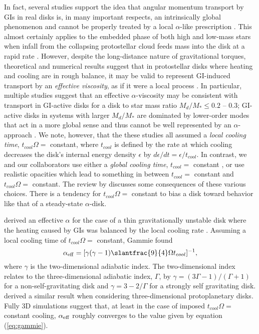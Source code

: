\documentclass[manuscript]{aastex}
\begin{document}
In fact, several studies support the idea that angular momentum transport by GIs in real disks is, in many important respects, an intrinsically global phenomenon and cannot be properly treated by a local $\alpha$-like prescription \citep{laughlin1996, balbus1999, lodato2005, mejia2005, boley2006, cai2008}.  This almost certainly applies to the embedded phase of both high and low-mass stars when infall from the collapsing protostellar cloud feeds mass into the disk at a rapid
rate \citep[e.g.,][]{yorke1993, laughlin1994, yorke1999,vorobyov2005,vorobyov2006,kratter2010}.  
However, despite the long-distance nature of gravitational torques, theoretical and numerical results suggest that in protostellar disks where heating and cooling are in rough balance, 
 it may be valid to represent GI-induced transport by an {\it effective viscosity}, as if it were a local process \citep{gammie2001, lodato2004, rice2005, cossins2009, vorobyov2010}.  In particular, multiple studies suggest that
an effective $\alpha$-viscosity may be consistent
with transport in GI-active disks for a disk to star mass ratio $M_d/M_* \le 0.2$ -- 0.3; GI-active disks
in systems with larger $M_d/M_*$ are dominated by lower-order modes that act in a more global sense and thus cannot be well represented by an $\alpha$-approach
\citep{lodato2004, cossins2009, vorobyov2010}. 
We note, however, that the these studies all assumed
a {\it local cooling time}, $t_{cool}\Omega =$ constant, 
where $t_{cool}$ is defined by the rate at which cooling decreases the disk's internal energy density
$\epsilon$ by $d\epsilon/dt = \epsilon / t_{cool}$.  In contrast, we and our collaborators use either a {\it global cooling time},
$t_{cool} = $ constant \citep[e.g.,][this paper]{pickett2003, mejia2005}, or use realistic opacities \citep[e.g.,][]{mejiaphd2004, cai2006, cai2008, boley2006, boley2007b,  boley2009} which lead to something in between $t_{cool} = $ constant  and
$t_{cool}\Omega =$ constant. The review by \citet{durisen2007} discusses some consequences of these various
choices. There is a tendency for $t_{cool}\Omega =$ constant to bias a disk toward behavior like that of a
steady-state $\alpha$-disk.

\citet{gammie2001} derived an effective $\alpha$ for the case of a thin gravitationally unstable disk where the heating
caused by GIs was balanced by the local cooling rate \citep[see also][]{pringle1981}.  
Assuming a local cooling time of $t_{cool}\Omega =$ constant,  Gammie found
\begin{equation}
\alpha_{\rm{eff}} = [\gamma(\gamma - 1) \slantfrac{9}{4}\Omega t_{cool}]^{-1},
\label{eq:gammie}
\end{equation}
where $\gamma$ is the two-dimensional adiabatic index. 
The two-dimensional index relates
to the three-dimensional adiabatic index, $\Gamma$, by 
$\gamma = (3\Gamma - 1) / (\Gamma + 1)$
for a non-self-gravitating
disk and
$\gamma = 3 - 2/\Gamma $
for a strongly self gravitating disk.   \cite{lodato2004} derived a similar result when considering three-dimensional protoplanetary disks.
Fully 3D simulations \citep[e.g.,][]{lodato2004, cossins2009} suggest that, at least in the case of imposed 
$t_{cool}\Omega = $ constant cooling, $\alpha_{\rm{\rm{eff}}}$ roughly converges to the value given by equation (\ref{eq:gammie}). 
\end{document}
